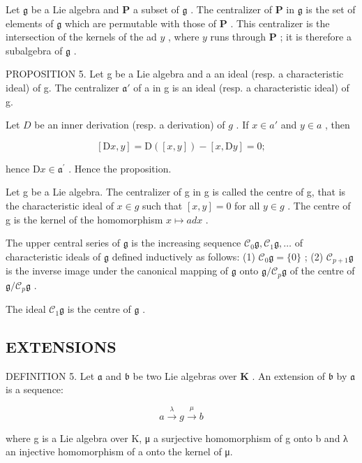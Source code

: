 Let \(\mathfrak{g}\) be a Lie algebra and \(\mathbf{P}\) a subset of \(\mathfrak{g}\) . The centralizer of \(\mathbf{P}\) in \(\mathfrak{g}\) is the set of elements of \(\mathfrak{g}\) which are permutable with those of \(\mathbf{P}\) . This centralizer is the intersection of the kernels of the ad \(y\) , where \(y\) runs through \(\mathbf{P}\) ; it is therefore a subalgebra of \(\mathfrak{g}\) .

PROPOSITION 5. Let g be a Lie algebra and a an ideal (resp. a characteristic ideal) of g. The centralizer \(\mathfrak{a}'\) of a in g is an ideal (resp. a characteristic ideal) of g.

Let \(D\) be an inner derivation (resp. a derivation) of \(g\) . If \(x \in a'\) and \(y \in a\) , then

\[
[ \mathrm{D} x, y ] = \mathrm{D} ([ x, y ]) - [ x, \mathrm{D} y ] = 0;
\]

hence \(\mathrm{D}x\in \mathfrak{a}^{\prime}\) . Hence the proposition.

Let g be a Lie algebra. The centralizer of g in g is called the centre of g, that is the characteristic ideal of \(x \in g\) such that \([x, y] = 0\) for all \(y \in g\) . The centre of g is the kernel of the homomorphism \(x \mapsto ad x\) .

The upper central series of \(\mathfrak{g}\) is the increasing sequence \(\mathcal{C}_{0}\mathfrak{g},\mathcal{C}_{1}\mathfrak{g},\ldots\) of characteristic ideals of \(\mathfrak{g}\) defined inductively as follows: (1) \(\mathcal{C}_{0}\mathfrak{g} = \{0\}\) ; (2) \(\mathcal{C}_{p + 1}\mathfrak{g}\) is the inverse image under the canonical mapping of \(\mathfrak{g}\) onto \(\mathfrak{g} / \mathcal{C}_{p}\mathfrak{g}\) of the centre of \(\mathfrak{g} / \mathcal{C}_{p}\mathfrak{g}\) .

The ideal \(\mathcal{C}_{1}\mathfrak{g}\) is the centre of \(\mathfrak{g}\) .

\subsection{EXTENSIONS}

DEFINITION 5. Let \(\mathfrak{a}\) and \(\mathfrak{b}\) be two Lie algebras over \(\mathbf{K}\) . An extension of \(\mathfrak{b}\) by \(\mathfrak{a}\) is a sequence:

\[
a \xrightarrow {\lambda} g \xrightarrow {\mu} b
\]

where g is a Lie algebra over K, μ a surjective homomorphism of g onto b and λ an injective homomorphism of a onto the kernel of μ.


